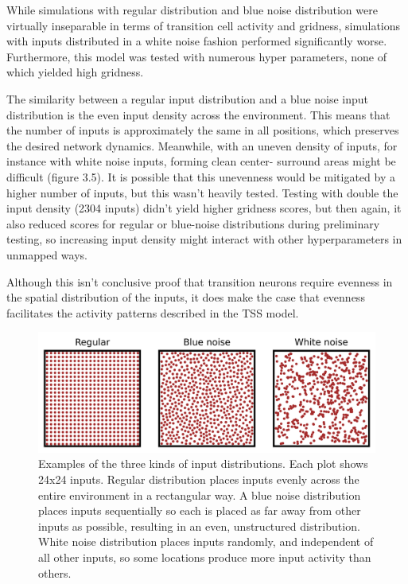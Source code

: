 \documentclass{article}
\begin{document}
    While simulations with regular distribution and blue noise distribution were virtually inseparable in terms of transition cell activity and gridness, simulations with inputs distributed in a white noise fashion performed significantly worse. Furthermore, this model was tested with numerous hyper parameters, none of which yielded high gridness.

    The similarity between a regular input distribution and a blue noise input distribution is the even input density across the environment. This means that the number of inputs is approximately the same in all positions, which preserves the desired network dynamics. Meanwhile, with an uneven density of inputs, for instance with white noise inputs, forming clean center- surround areas might be difficult (figure 3.5). It is possible that this unevenness would be mitigated by a higher number of inputs, but this wasn't heavily tested. Testing with double the input density (2304 inputs) didn't yield higher gridness scores, but then again, it also reduced scores for regular or blue-noise distributions during preliminary testing, so increasing input density might interact with other hyperparameters in unmapped ways.

    Although this isn't conclusive proof that transition neurons require evenness in the spatial distribution of the inputs, it does make the case that evenness facilitates the activity patterns described in the TSS model.


    \begin{figure}[H]
        \centering
        \includegraphics[width=15cm]{distribution_plot.png}
        \caption{Examples of the three kinds of input distributions. Each plot shows 24x24 inputs. Regular distribution places inputs evenly across the entire environment in a rectangular way. A blue noise distribution places inputs sequentially so each is placed as far away from other inputs as possible, resulting in an even, unstructured distribution. White noise distribution places inputs randomly, and independent of all other inputs, so some locations produce more input activity than others.}
        \label{distribution_plot}
    \end{figure}
\end{document}

